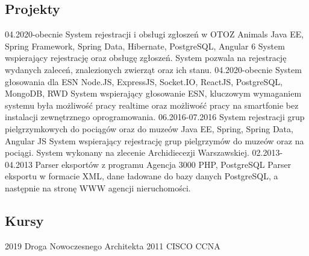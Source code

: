 \documentclass[]{friggeri-cv} %
\begin{document}
	\begin{absolutelynopagebreak}
		\section{Projekty}
		\begin{entrylist}
			\entry
			{04.2020-obecnie}
			{System rejestracji i obsługi zgłoszeń w OTOZ Animals}
			{Java EE, Spring Framework, Spring Data, Hibernate, PostgreSQL, Angular 6}
			{System wspierający rejestrację oraz obsługę zgłoszeń. System pozwala na rejestrację wydanych zaleceń, znalezionych zwierząt oraz ich stanu.}
			\entry
			{04.2020-obecnie}
			{System głosowania dla ESN}
			{Node.JS, ExpressJS, Socket.IO, ReactJS, PostgreSQL, MongoDB, RWD}
			{System wspierający głosowanie ESN, kluczowym wymaganiem systemu była możliwość pracy realtime oraz możliwość pracy na smartfonie bez instalacji zewnętrznego oprogramowania.}
			\entry
			{06.2016-07.2016}
			{System rejestracji grup pielgrzymkowych do pociągów oraz do muzeów}
			{Java EE, Spring, Spring Data, Angular JS}
			{System wspierający rejestrację grup pielgrzymów do muzeów oraz na pociągi. System wykonany na zlecenie Archidiecezji Warszawskiej.}
			\entry
			{02.2013-04.2013}
			{Parser eksportów z programu Agencja 3000}
			{PHP, PostgreSQL}
			{Parser eksportu w formacie XML, dane ładowane do bazy danych PostgreSQL, a następnie na stronę WWW agencji nieruchomości.}
		\end{entrylist}
	\end{absolutelynopagebreak}
	
	\begin{absolutelynopagebreak}
		\section{Kursy}
		\begin{entrylist}
			\cert
			{2019}
			{Droga Nowoczesnego Architekta}
			\cert
			{2011}
			{CISCO CCNA}
		\end{entrylist}
	\end{absolutelynopagebreak}
	
\end{document}
